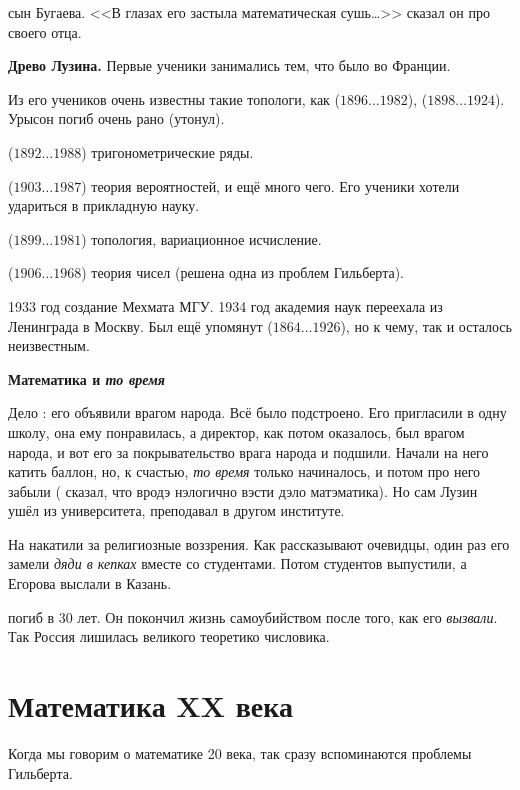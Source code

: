 \documentclass[a4paper,oneside,fleqn,10pt]{article}
\newcommand{\pe}[2]{${#1}\ldots{#2}$}
\begin{document}
 сын Бугаева.
<<В глазах его застыла математическая сушь\ldots>> сказал он про своего отца.

\textbf{Древо Лузина.}
Первые ученики  занимались тем, что было во Франции.

Из его учеников
очень известны такие топологи, как  (\pe{1896}{1982}),
 (\pe{1898}{1924}).
Урысон погиб очень рано (утонул).

 (\pe{1892}{1988}) тригонометрические ряды.

 (\pe{1903}{1987}) теория вероятностей, и ещё много чего.
Его ученики хотели удариться в прикладную науку.

 (\pe{1899}{1981}) топология, вариационное исчисление.

 (\pe{1906}{1968}) теория чисел (решена одна из проблем Гильберта).

1933 год создание Мехмата МГУ. 1934 год академия наук переехала из Ленинграда в Москву.
Был ещё упомянут  (\pe{1864}{1926}), но к чему, так и осталось неизвестным.

\textbf{Математика и \emph{то время}}

Дело : его объявили врагом народа. Всё было подстроено.
Его пригласили в одну школу, она ему понравилась, а директор, как потом оказалось,
был врагом народа, и вот его
за покрывательство врага народа и подшили.
Начали на него катить баллон, но, к счастью, \emph{то время} только начиналось,
и потом про него забыли ( сказал, что вродэ нэлогично вэсти дэло
матэматика). Но сам Лузин ушёл из университета, преподавал в другом институте.

На  накатили за религиозные воззрения. Как рассказывают очевидцы,
один раз его замели \emph{дяди в кепках} вместе со студентами. Потом студентов
выпустили, а Егорова выслали в Казань.

 погиб в 30 лет. Он покончил жизнь самоубийством после того, как его \emph{вызвали}.
Так Россия лишилась великого теоретико числовика.



\section{Математика XX века}

Когда мы говорим о математике 20 века, так сразу вспоминаются проблемы Гильберта.
\end{document}
